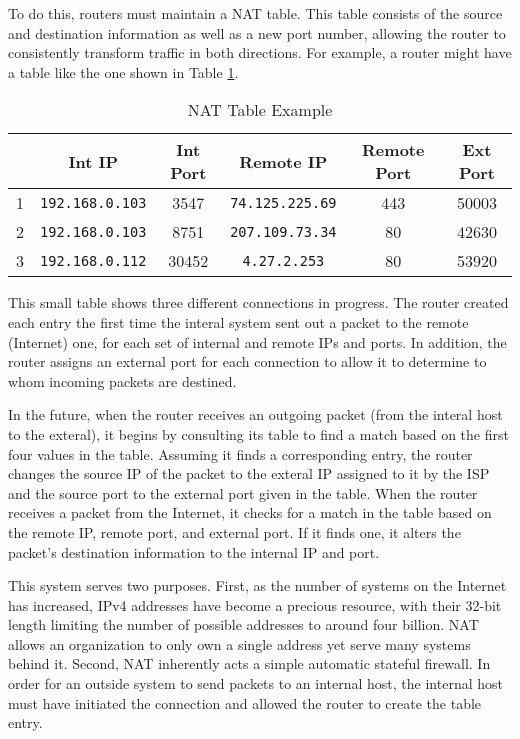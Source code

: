 \par To do this, routers must maintain a \ac{NAT} table. This table consists of the source and destination information as well as a new port number, allowing the router to consistently transform traffic in both directions. For example, a router might have a table like the one shown in Table \ref{tab:nat_example}.

\begin{table}
\caption{NAT Table Example}
\label{tab:nat_example}
\centering
\begin{tabular}{r|ccccc}
  & Int IP & Int Port & Remote IP & Remote Port & Ext Port\\
\hline
1 & \texttt{192.168.0.103} & 3547 & \texttt{74.125.225.69} & 443 & 50003\\
2 & \texttt{192.168.0.103} & 8751 & \texttt{207.109.73.34} & 80 & 42630\\
3 & \texttt{192.168.0.112} & 30452 & \texttt{4.27.2.253} & 80 & 53920
\end{tabular}
\end{table}

\par This small table shows three different connections in progress. The router created each entry the first time the interal system sent out a packet to the remote (Internet) one, for each set of internal and remote IPs and ports. In addition, the router assigns an external port for each connection to allow it to determine to whom incoming packets are destined.

\par In the future, when the router receives an outgoing packet (from the interal host to the exteral), it begins by consulting its table to find a match based on the first four values in the table. Assuming it finds a corresponding entry, the router changes the source IP of the packet to the exteral IP assigned to it by the \ac{ISP} and the source port to the external port given in the table. When the router receives a packet from the Internet, it checks for a match in the table based on the remote IP, remote port, and external port. If it finds one, it alters the packet's destination information to the internal IP and port.

\par This system serves two purposes. First, as the number of systems on the Internet has increased, \ac{IPv4} addresses have become a precious resource, with their 32-bit length limiting the number of possible addresses to around four billion. \ac{NAT} allows an organization to only own a single address yet serve many systems behind it. Second, \ac{NAT} inherently acts a simple automatic stateful firewall. In order for an outside system to send packets to an internal host, the internal host must have initiated the connection and allowed the router to create the table entry.

